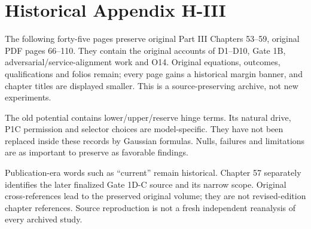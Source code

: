 \chapter*{Historical Appendix H-III}
The following forty-five pages preserve original Part III Chapters 53--59,
original PDF pages 66--110. They contain the original accounts of D1--D10,
Gate 1B, adversarial/service-alignment work and O14. Original equations,
outcomes, qualifications and folios remain; every page gains a historical
margin banner, and chapter titles are displayed smaller. This is a
source-preserving archive, not new experiments.

The old potential contains lower/upper/reserve hinge terms. Its natural
drive, P1C permission and selector choices are model-specific. They have not
been replaced inside these records by Gaussian formulas. Nulls, failures and
limitations are as important to preserve as favorable findings.

Publication-era words such as ``current'' remain historical. Chapter 57
separately identifies the later finalized Gate 1D-C source and its narrow
scope. Original cross-references lead to the preserved original volume;
they are not revised-edition chapter references. Source reproduction is not
a fresh independent reanalysis of every archived study.
